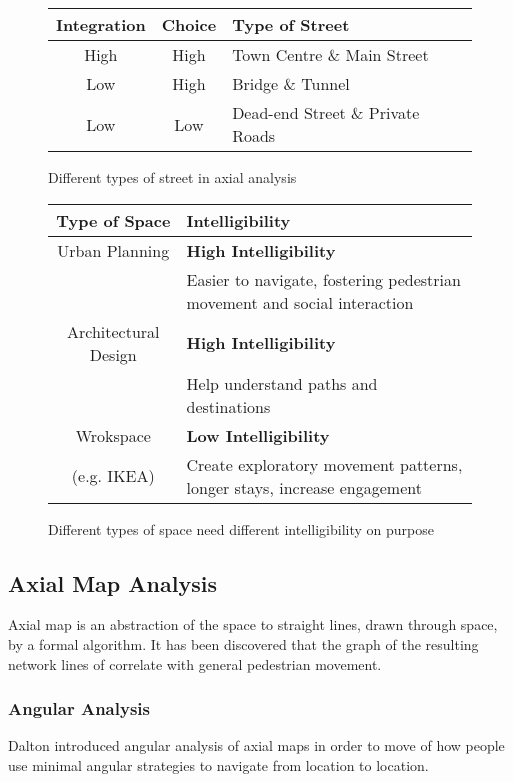 \documentclass[a4paper, openany]{book}
\begin{document}
\begin{figure}[htbp]
  \centering
  \begin{tabular}{ccl}
    \hline
    \textbf{Integration} & \textbf{Choice} & \textbf{Type of Street}\\
    \hline
    High & High & Town Centre \& Main Street\\
    Low & High & Bridge \& Tunnel\\
    Low & Low & Dead-end Street \& Private Roads\\
    \hline
  \end{tabular}
  \caption{Different types of street in axial analysis}
  \qquad
  \begin{tabular}{cl}
    \hline
    \textbf{Type of Space} & \textbf{Intelligibility}\\
    \hline
    Urban Planning & \textbf{High Intelligibility} \\ & Easier to navigate, fostering pedestrian movement and social interaction\\
    Architectural Design & \textbf{High Intelligibility}\\ & Help understand paths and destinations\\
    Wrokspace & \textbf{Low Intelligibility} \\ (e.g. IKEA) & Create exploratory movement patterns, longer stays, increase engagement\\
    \hline
  \end{tabular}
  \caption{Different types of space need different intelligibility on purpose}
\end{figure}

\subsection{Axial Map Analysis}

Axial map is an abstraction of the space to straight lines, drawn through space, by a formal algorithm. It has been discovered that the graph of the resulting network lines of correlate with general pedestrian movement.

\subsubsection{Angular Analysis}

Dalton introduced angular analysis of axial maps in order to move of how people use minimal angular strategies to navigate from location to location.
\end{document}
